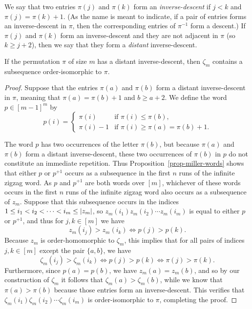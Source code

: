 We say that two entries $\pi(j)$ and $\pi(k)$ form an \emph{inverse-descent} if $j<k$ and $\pi(j)=\pi(k)+1$. (As the name is meant to indicate, if a pair of entries forms an inverse-descent in $\pi$, then the corresponding entries of $\pi^{-1}$ form a descent.) If $\pi(j)$ and $\pi(k)$ form an inverse-descent and they are not adjacent in $\pi$ (so $k\ge j+2$), then we say that they form a \emph{distant} inverse-descent.

\begin{proposition}
	\label{prop-distant-inv-desc}
	If the permutation $\pi$ of size $m$ has a distant inverse-descent, then $\zeta_m$ contains a subsequence order-isomorphic to $\pi$.
\end{proposition}
\begin{proof}
	Suppose that the entries $\pi(a)$ and $\pi(b)$ form a distant inverse-descent in $\pi$, meaning that $\pi(a)=\pi(b)+1$ and $b\ge a+2$. We define the word $p\in [m-1]^m$ by
	\[
		p(i)
		=
		\left\{\begin{array}{ll}
			\pi(i)   &\text{if $\pi(i)\le\pi(b)$,}\\
			\pi(i)-1 &\text{if $\pi(i)\ge\pi(a)=\pi(b)+1$.}
		\end{array}\right.
	\]

	The word $p$ has two occurrences of the letter $\pi(b)$, but because $\pi(a)$ and $\pi(b)$ form a distant inverse-descent, these two occurrences of $\pi(b)$ in $p$ do not constitute an immediate repetition. Thus Proposition~\ref{prop-miller-words} shows that either $p$ or $p^{+1}$ occurs as a subsequence in the first $n$ runs of the infinite zigzag word. As $p$ and $p^{+1}$ are both words over $[m]$, whichever of these words occurs in the first $n$ runs of the infinite zigzag word  also occurs as a subsequence of $z_m$. Suppose that this subsequence occurs in the indices $1\le i_1<i_2<\cdots<i_m\le \left\lvert{z_m}\right\rvert$, so $z_m(i_1)z_m(i_2)\cdots z_m(i_m)$ is equal to either $p$ or $p^{+1}$, and thus for $j,k \in [m]$ we have
	\[
		z_m(i_j) > z_m(i_k)
		\iff 
		p(j) > p(k).
	\]
	Because $z_m$ is order-homomorphic to $\zeta_m$, this implies that for all pairs of indices $j,k\in[m]$ except the pair $\{a,b\}$, we have
	\[
		\zeta_m(i_j) > \zeta_m(i_k)
		\iff 
		p(j) > p(k)
		\iff 
		\pi(j) > \pi(k).
	\]
	Furthermore, since $p(a)=p(b)$, we have $z_m(a)=z_m(b)$, and so by our construction of $\zeta_m$ it follows that $\zeta_m(a)>\zeta_m(b)$, while we know that $\pi(a)>\pi(b)$ because those entries form an inverse-descent. This verifies that $\zeta_m(i_1)\zeta_m(i_2)\cdots \zeta_m(i_m)$ is order-isomorphic to $\pi$, completing the proof.
\end{proof}

